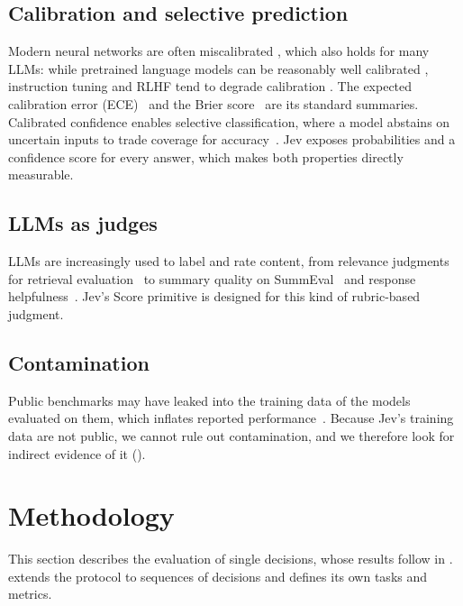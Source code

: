 \documentclass[table]{article}
\begin{document}
\subsection{Calibration and selective prediction}
Modern neural networks are often miscalibrated \cite{guo2017calibration}, which also holds for many LLMs: while pretrained language models can be reasonably well calibrated \cite{kadavath2022languagemodelsmostlyknow}, instruction tuning and RLHF tend to degrade calibration \cite{openai2024gpt4technicalreport,tian-etal-2023-just}.
The expected calibration error (ECE)~\cite{naeini2015obtaining} and the Brier score~\cite{glenn1950verification} are its standard summaries. Calibrated confidence enables selective classification, where a model abstains on uncertain inputs to trade coverage for accuracy~\cite{geifman2017selective}. Jev exposes probabilities and a confidence score for every answer, which makes both properties directly measurable.

\subsection{LLMs as judges}
LLMs are increasingly used to label and rate content, from relevance judgments for retrieval evaluation~\cite{faggioli2023perspectives,thomas2024preferences} to summary quality on SummEval~\cite{fabbri2021summeval,liu-etal-2023-g} and response helpfulness~\cite{wang2024helpsteer2}. Jev's Score primitive is designed for this kind of rubric-based judgment.

\subsection{Contamination}
Public benchmarks may have leaked into the training data of the models evaluated on them, which inflates reported performance~\cite{sainz-etal-2023-nlp}. Because Jev's training data are not public, we cannot rule out contamination, and we therefore look for indirect evidence of it ().


\section{Methodology}

This section describes the evaluation of single decisions, whose results follow in .  extends the protocol to sequences of decisions and defines its own tasks and metrics.
\end{document}
